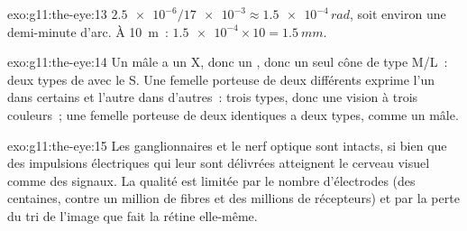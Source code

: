 \begin{solution}{exo:g11:the-eye:13}
$\num{2.5e-6}/\num{17e-3} \approx \num{1.5e-4}\,\unit{rad}$, soit
environ une demi-minute d'arc. À \qty{10}{m}~: $\num{1.5e-4} \times 10 =
\qty{1.5}{mm}$.
\end{solution}

\begin{solution}{exo:g11:the-eye:14}
Un mâle a un X, donc un , donc un seul cône de type M/L~: deux
types de  avec le S. Une femelle porteuse de deux 
différents exprime l'un dans certains  et l'autre dans d'autres~:
trois types, donc une vision à trois couleurs~; une femelle porteuse de
deux  identiques a deux types, comme un mâle.
\end{solution}

\begin{solution}{exo:g11:the-eye:15}
Les  ganglionnaires et le nerf optique sont intacts, si bien
que des impulsions électriques qui leur sont délivrées atteignent le
cerveau visuel comme des signaux. La qualité est limitée par le nombre
d'électrodes (des centaines, contre un million de fibres et des
millions de récepteurs) et par la perte du tri de l'image que fait la
rétine elle-même.
\end{solution}

